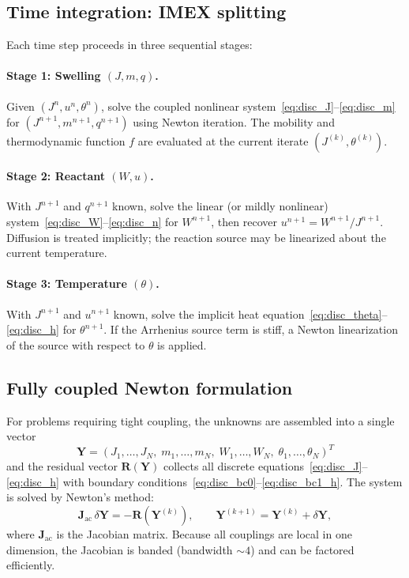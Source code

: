 \documentclass[aps,pre,reprint,superscriptaddress,longbibliography,floatfix]{revtex4-2}
\begin{document}
\subsection{Time integration: IMEX splitting}

Each time step proceeds in three sequential stages:

\paragraph{Stage 1: Swelling $(J,m,q)$.}
Given $(J^n, u^n, \theta^n)$, solve the coupled nonlinear system~\eqref{eq:disc_J}--\eqref{eq:disc_m} for $(J^{n+1}, m^{n+1}, q^{n+1})$ using Newton iteration. The mobility and thermodynamic function $f$ are evaluated at the current iterate $(J^{(k)},\theta^{(k)})$.

\paragraph{Stage 2: Reactant $(W,u)$.}
With $J^{n+1}$ and $q^{n+1}$ known, solve the linear (or mildly nonlinear) system~\eqref{eq:disc_W}--\eqref{eq:disc_n} for $W^{n+1}$, then recover $u^{n+1} = W^{n+1}/J^{n+1}$. Diffusion is treated implicitly; the reaction source may be linearized about the current temperature.

\paragraph{Stage 3: Temperature $(\theta)$.}
With $J^{n+1}$ and $u^{n+1}$ known, solve the implicit heat equation~\eqref{eq:disc_theta}--\eqref{eq:disc_h} for $\theta^{n+1}$. If the Arrhenius source term is stiff, a Newton linearization of the source with respect to $\theta$ is applied.

\subsection{Fully coupled Newton formulation}

For problems requiring tight coupling, the unknowns are assembled into a single vector
\begin{equation}
  \bm{Y} = (J_1,\dots,J_N,\;m_1,\dots,m_N,\;W_1,\dots,W_N,\;\theta_1,\dots,\theta_N)^T
\end{equation}
and the residual vector $\bm{R}(\bm{Y})$ collects all discrete equations~\eqref{eq:disc_J}--\eqref{eq:disc_h} with boundary conditions~\eqref{eq:disc_bc0}--\eqref{eq:disc_bc1_h}. The system is solved by Newton's method:
\begin{equation}
  \bm{J}_\mathrm{ac}\,\delta\bm{Y} = -\bm{R}(\bm{Y}^{(k)}),
  \qquad
  \bm{Y}^{(k+1)} = \bm{Y}^{(k)} + \delta\bm{Y},
\end{equation}
where $\bm{J}_\mathrm{ac}$ is the Jacobian matrix. Because all couplings are local in one dimension, the Jacobian is banded (bandwidth $\sim 4$) and can be factored efficiently.
\end{document}
